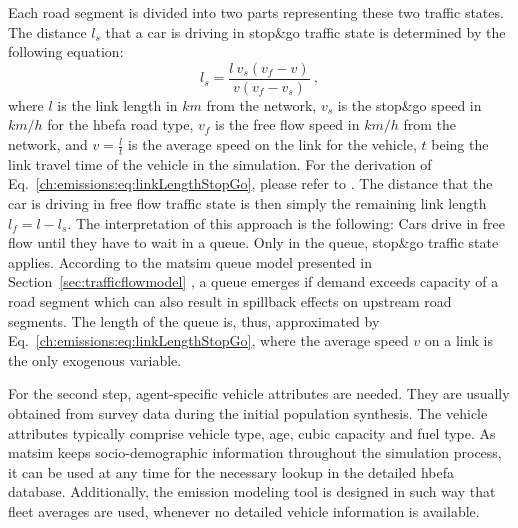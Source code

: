 %
Each road segment is divided into two parts representing these two 
traffic states. The distance $l_s$ that a car is driving in stop\&go traffic 
state  is determined by the following equation:
%
\begin{equation}
l_s = \frac{l \ v_s  (v_f-v)}{v (v_f - v_s)} \ ,
\label{ch:emissions:eq:linkLengthStopGo}
\end{equation}
%
where $l$ is the link length in $km$ from the network, $v_s$ is the stop\&go speed in $km/h$ for the \gls{hbefa} road type, $v_f$ is the free flow speed in $km/h$ from the network, and $v=\frac{l}{t}$ is the average speed on the link for the vehicle, $t$ being the link travel time of the vehicle in the simulation. For the derivation of Eq.~\ref{ch:emissions:eq:linkLengthStopGo}, please refer to \citet{Kickhoefer_PhDThesis_2014}. The distance that the car is driving in free flow traffic state is then simply the remaining link length $l_f = l - l_s$.
%
The interpretation of this approach is the following:
%
Cars drive in free flow until they have to wait in a queue. Only in the queue, stop\&go traffic state applies. According to the \gls{matsim} queue model presented in Section~\ref{sec:trafficflowmodel}
%
%
, a queue emerges if demand exceeds capacity of a road segment which can also result in spillback effects on upstream road segments. The length of the queue is, thus, approximated by Eq.~\ref{ch:emissions:eq:linkLengthStopGo}, where the average speed $v$ on a link is the only exogenous variable.

For the second step, agent-specific vehicle attributes are needed. They are 
usually obtained from survey data during the initial population 
synthesis. The vehicle attributes typically comprise vehicle type, age, cubic 
capacity 
and fuel type. As \gls{matsim} keeps socio-demographic information throughout 
the 
simulation process, it can be used at any time for the necessary lookup in the 
detailed \gls{hbefa} database. Additionally, the emission modeling tool 
is designed in such way that fleet averages are used, whenever no detailed 
vehicle information is available.

